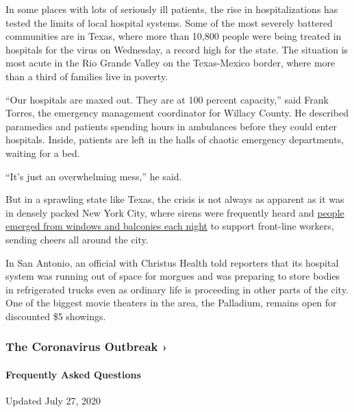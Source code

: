 In some places with lots of seriously ill patients, the rise in
hospitalizations has tested the limits of local hospital systems. Some
of the most severely battered communities are in Texas, where more than
10,800 people were being treated in hospitals for the virus on
Wednesday, a record high for the state. The situation is most acute in
the Rio Grande Valley on the Texas-Mexico border, where more than a
third of families live in poverty.

``Our hospitals are maxed out. They are at 100 percent capacity,'' said
Frank Torres, the emergency management coordinator for Willacy County.
He described paramedics and patients spending hours in ambulances before
they could enter hospitals. Inside, patients are left in the halls of
chaotic emergency departments, waiting for a bed.

``It's just an overwhelming mess,'' he said.

But in a sprawling state like Texas, the crisis is not always as
apparent as it was in densely packed New York City, where sirens were
frequently heard and
\href{https://www.nytimes.com/interactive/2020/04/10/nyregion/nyc-7pm-cheer-thank-you-coronavirus.html}{people
emerged from windows and balconies each night} to support front-line
workers, sending cheers all around the city.

In San Antonio, an official with Christus Health told reporters that its
hospital system was running out of space for morgues and was preparing
to store bodies in refrigerated trucks even as ordinary life is
proceeding in other parts of the city. One of the biggest movie theaters
in the area, the Palladium, remains open for discounted \$5 showings.

\href{https://www.nytimes.com/news-event/coronavirus?action=click\&pgtype=Article\&state=default\&region=MAIN_CONTENT_3\&context=storylines_faq}{}

\hypertarget{the-coronavirus-outbreak-}{%
\subsubsection{The Coronavirus Outbreak
›}\label{the-coronavirus-outbreak-}}

\hypertarget{frequently-asked-questions}{%
\paragraph{Frequently Asked
Questions}\label{frequently-asked-questions}}

Updated July 27, 2020

